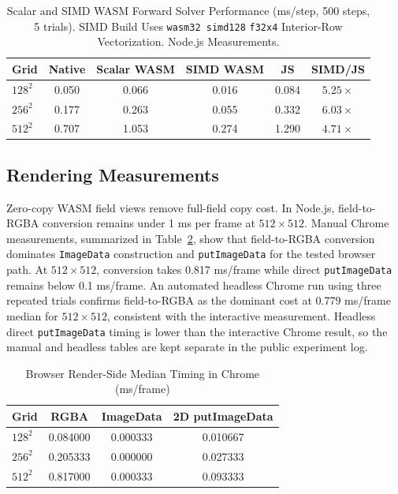 \documentclass[journal]{IEEEtran}
\begin{document}
\begin{table}[!t]
\renewcommand{\arraystretch}{1.15}
\caption{Scalar and SIMD WASM Forward Solver Performance (ms/step, 500 steps,
5 trials). SIMD Build Uses \texttt{wasm32 simd128} \texttt{f32x4}
Interior-Row Vectorization. Node.js Measurements.}
\label{tab:perf}
\centering
\begin{tabular}{lccccc}
\hline
Grid & Native & Scalar WASM & SIMD WASM & JS & SIMD/JS\\
\hline
\(128^2\) & 0.050 & 0.066 & 0.016 & 0.084 & \(5.25\times\)\\
\(256^2\) & 0.177 & 0.263 & 0.055 & 0.332 & \(6.03\times\)\\
\(512^2\) & 0.707 & 1.053 & 0.274 & 1.290 & \(4.71\times\)\\
\hline
\end{tabular}
\end{table}

\subsection{Rendering Measurements}
Zero-copy WASM field views remove full-field copy cost. In Node.js, field-to-RGBA
conversion remains under 1 ms per frame at \(512\times512\). Manual Chrome
measurements, summarized in Table~\ref{tab:render}, show that field-to-RGBA
conversion dominates \texttt{ImageData} construction and \texttt{putImageData}
for the tested browser path. At \(512\times512\), conversion takes
0.817 ms/frame while direct \texttt{putImageData} remains below 0.1 ms/frame.
An automated headless Chrome run using three repeated trials confirms
field-to-RGBA as the dominant cost at 0.779 ms/frame median for
\(512\times512\), consistent with the interactive measurement. Headless direct
\texttt{putImageData} timing is lower than the interactive Chrome result, so the
manual and headless tables are kept separate in the public experiment log.

\begin{table}[!t]
\renewcommand{\arraystretch}{1.15}
\caption{Browser Render-Side Median Timing in Chrome (ms/frame)}
\label{tab:render}
\centering
\begin{tabular}{lccc}
\hline
Grid & RGBA & ImageData & 2D putImageData\\
\hline
\(128^2\) & 0.084000 & 0.000333 & 0.010667\\
\(256^2\) & 0.205333 & 0.000000 & 0.027333\\
\(512^2\) & 0.817000 & 0.000333 & 0.093333\\
\hline
\end{tabular}
\end{table}
\end{document}
